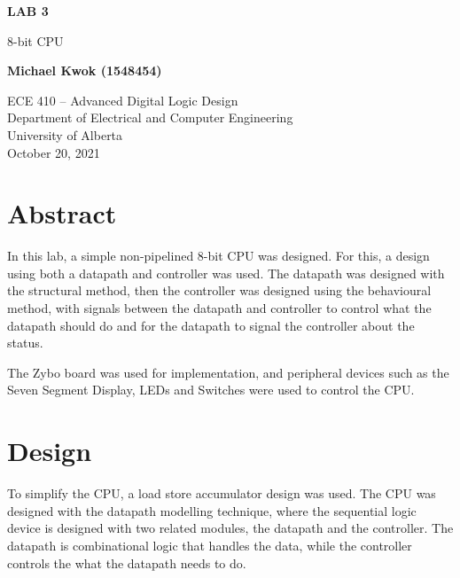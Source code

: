 \documentclass[12pt]{article}
\begin{document}
\begin{titlepage}
  \begin{center}
    \vspace*{1cm}

    \textbf{LAB 3}

    \vspace{0.5cm}

    8-bit CPU

    \vspace{1.5cm}

    \textbf{Michael Kwok (1548454)}

    \vfill

    ECE 410 -- Advanced Digital Logic Design\\
    Department of Electrical and Computer Engineering\\
    University of Alberta\\
    October 20, 2021

  \end{center}
\end{titlepage}

\tableofcontents

\pagebreak

\section{Abstract}

In this lab, a simple non-pipelined 8-bit CPU was designed. For this, a design using both a datapath and controller was used. The datapath was designed with the structural method, then the controller was designed using the behavioural method, with signals between the datapath and controller to control what the datapath should do and for the datapath to signal the controller about the status.

The Zybo board was used for implementation, and peripheral devices such as the Seven Segment Display, LEDs and Switches were used to control the CPU.

\section{Design}

To simplify the CPU, a load store accumulator design was used. The CPU was designed with the datapath modelling technique, where the sequential logic device is designed with two related modules, the datapath and the controller. The datapath is combinational logic that handles the data, while the controller controls the what the datapath needs to do.
\end{document}
